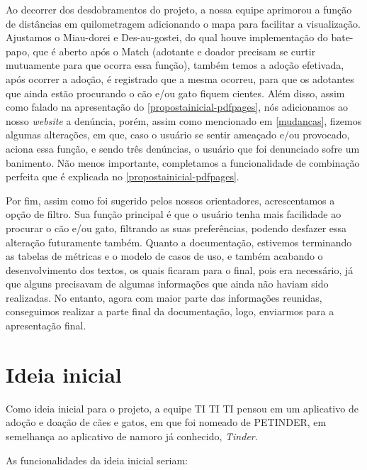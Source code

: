 Ao decorrer dos desdobramentos do projeto, a nossa equipe aprimorou a função de distâncias em quilometragem adicionando o mapa para facilitar a visualização. Ajustamos o \gls{Miau-dorei} e \gls{Des-au-gostei}, do qual houve implementação do bate-papo, que é aberto após o \gls{Match} (adotante e doador precisam se curtir mutuamente para que ocorra essa função), também temos a adoção efetivada, após ocorrer a adoção, é registrado que a mesma ocorreu, para que os adotantes que ainda estão procurando o cão e/ou gato fiquem cientes. Além disso, assim como falado na apresentação do \autoref{propostainicial-pdfpages}, nós adicionamos ao nosso \textit{website} a denúncia, porém, assim como mencionado em \autoref{mudancas}, fizemos algumas alterações, em que, caso o usuário se sentir ameaçado e/ou provocado, aciona essa função, e sendo três denúncias, o usuário que foi denunciado sofre um banimento. Não menos importante, completamos a funcionalidade de combinação perfeita que é explicada no \autoref{propostainicial-pdfpages}.

Por fim, assim como foi sugerido pelos nossos orientadores, acrescentamos a opção de filtro. Sua função principal é que o usuário tenha mais facilidade ao procurar o cão e/ou gato, filtrando as suas preferências, podendo desfazer essa alteração futuramente também. Quanto a documentação, estivemos terminando as tabelas de métricas e o modelo de casos de uso, e também acabando o desenvolvimento dos textos, os quais ficaram para o final, pois era necessário, já que alguns precisavam de algumas informações que ainda não haviam sido realizadas. No entanto, agora com maior parte das informações reunidas, conseguimos realizar a parte final da documentação, logo, enviarmos para a apresentação final.


\section{Ideia inicial}
Como ideia inicial para o projeto, a equipe TI TI TI pensou em um aplicativo de adoção e doação de cães e gatos, em que foi nomeado de PETINDER, em semelhança ao aplicativo de namoro já conhecido, \textit{Tinder}. 

As funcionalidades da ideia inicial seriam:

